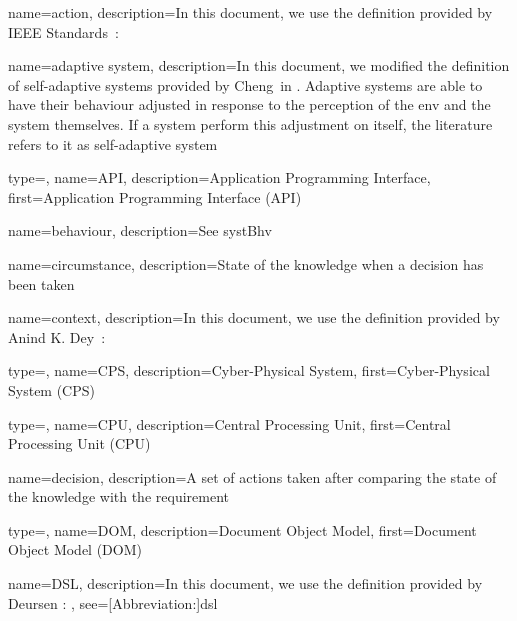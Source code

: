 {
	name={ac\-tion},
	description={In this document, we use the definition provided by IEEE Standards~\cite{iso2017systems}: }
}

{
	name={a\-dap\-tive sys\-tem},
	description={In this document, we modified the definition of self-adaptive systems provided by Cheng~\etal in \cite{DBLP:conf/dagstuhl/ChengLGIMABBBCSDFGGGKKKLMMMPSTTWW09}. Adaptive systems are able to have their \gls{behaviour} adjusted in response to the perception of the \gls{env} and the system themselves. If a system perform this adjustment on itself, the literature refers to it as self-adaptive system}
}

{
	type=\acronymtype,
	name={API},
	description={Application Programming Interface},
	first={Application Programming Interface (API)}
}

{
	name={be\-ha\-viour},
	description={See \gls{systBhv}}
}

{
	name={cir\-cums\-tance},
	description={State of the \gls{knowledge} when a \gls{decision} has been taken}
}

{
	name={con\-text},
	description={In this document, we use the definition provided by Anind K. Dey~\cite{DBLP:journals/puc/Dey01}: }
}

{
	type=\acronymtype,
	name={CPS},
	description={Cyber-Physical System},
	first={Cyber-Physical System (CPS)}
}

{
	type=\acronymtype,
	name={CPU},
	description={Central Processing Unit},
	first={Central Processing Unit (CPU)}
}

{
	name={de\-ci\-sion},
	description={A set of \glspl{action} taken after comparing the state of the \gls{knowledge} with the \gls{requirement}}
}

{
	type=\acronymtype,
	name={DOM},
	description={Document Object Model},
	first={Document Object Model (DOM)}
}

{
	name={DSL},
	description={In this document, we use the definition provided by Deursen \etal \cite{DBLP:journals/sigplan/DeursenKV00}: },
	see=[Abbreviation:]{dsl}
}

